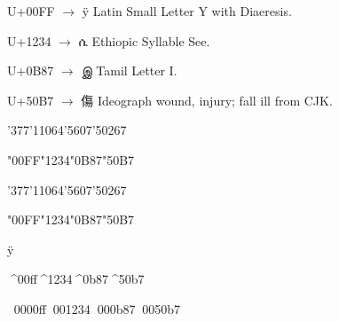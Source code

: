 \documentclass{minimal}
\begin{document}

    U+00FF \(\rightarrow\) ÿ Latin Small Letter Y with Diaeresis.

    U+1234 \(\rightarrow\) \textamharic{ሴ} Ethiopic Syllable See.
    
    U+0B87 \(\rightarrow\) \texttamil{இ} Tamil Letter I.
    
    U+50B7 \(\rightarrow\) 傷 Ideograph wound, injury; fall ill from CJK.

    \char'377\textamharic{\char'11064}\texttamil{\char'5607}\char'50267

    \textamharic{}\texttamil{}
    
    \char"00FF\textamharic{\char"1234}\texttamil{\char"0B87}\char"50B7


    \Uchar'377\textamharic{\Uchar'11064}\texttamil{\Uchar'5607}\Uchar'50267
    
    \textamharic{}\texttamil{}
    
    \Uchar"00FF\textamharic{\Uchar"1234}\texttamil{\Uchar"0B87}\Uchar"50B7

    ^^ff %
    
    ^^^^00ff\textamharic{^^^^1234}\texttamil{^^^^0b87}^^^^50b7
    
    ^^^^^^0000ff\textamharic{^^^^^^001234}\texttamil{^^^^^^000b87}^^^^^^0050b7
\end{document}
